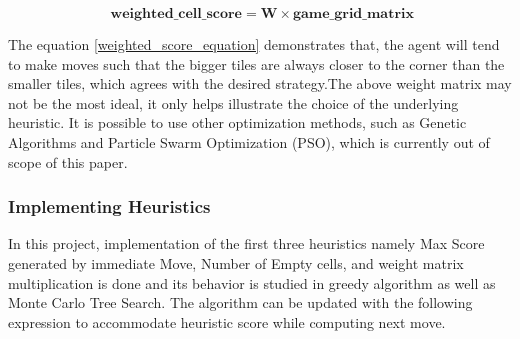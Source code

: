 \documentclass{svproc}
\begin{document}
\begin{itemize}
        \begin{equation} \label{weighted_score_equation}
        \textbf{ weighted\_cell\_score} = \textbf{W} \times \textbf{game\_grid\_matrix}
        \end{equation}

        The equation \ref{weighted_score_equation} demonstrates that, the agent will tend to make moves such that the bigger tiles are always closer to the corner than the smaller tiles, which agrees with the desired strategy.The above weight matrix may not be the most ideal, it only helps illustrate the choice of the underlying heuristic. It is possible to use other optimization methods, such as Genetic Algorithms and Particle Swarm Optimization (PSO), which is currently out of scope of this paper.




    \end{itemize}


    \subsubsection{Implementing Heuristics}
    In this project, implementation of the first three heuristics namely Max Score generated by immediate Move, Number of Empty cells, and weight matrix multiplication is done and its behavior is studied in greedy algorithm as well as Monte Carlo Tree Search. The algorithm can be updated with the following expression to accommodate heuristic score while computing next move.
\end{document}
